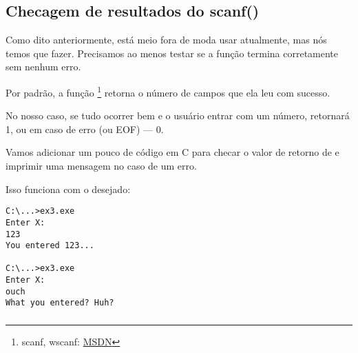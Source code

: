 \subsection{Checagem de resultados do scanf()}

Como dito anteriormente, está meio fora de moda usar \scanf atualmente, mas nós temos que fazer.
Precisamos ao menos testar se a função \scanf termina corretamente sem nenhum erro.



Por padrão, a função \scanf\footnote{scanf, wscanf: \href{http://go.yurichev.com/17255}{MSDN}} retorna o número de campos que ela leu com sucesso.

No nosso caso, se tudo ocorrer bem e o usuário entrar com um número, \scanf retornará 1, ou em caso de erro (ou \ac{EOF}) --- 0.

Vamos adicionar um pouco de código em C para checar o valor de retorno de \scanf e imprimir uma mensagem no caso de um erro.

Isso funciona com o desejado:

\begin{lstlisting}
C:\...>ex3.exe
Enter X:
123
You entered 123...

C:\...>ex3.exe
Enter X:
ouch
What you entered? Huh?
\end{lstlisting}






\subsubsection{\Exercise}

\PTBRph{}

